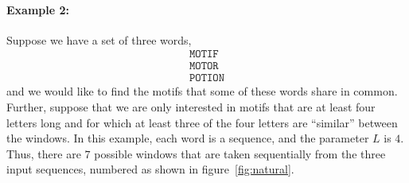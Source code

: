         \paragraph{Example 2:}
    Suppose we have a set of three words,
    \begin{eqnarray*}
        \texttt{MOTIF}\\
        \texttt{MOTOR}\\
        \texttt{POTION}
    \end{eqnarray*}
    and we would like to find the motifs that some of these words
    share in common.  Further, suppose that we are only interested
    in motifs that are at least four letters long and for which at
    least three of the four letters are ``similar'' between the windows.
    In this example, each word is a sequence, and the parameter $L$ is
    $4$.  Thus, there are $7$ possible windows that are taken
    sequentially from the three input sequences, numbered as shown in
    figure~\ref{fig:natural}.



